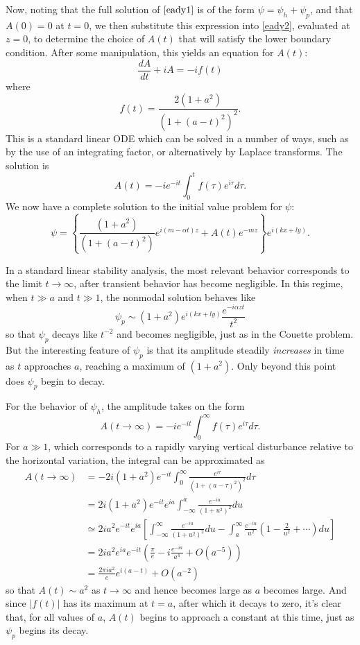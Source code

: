 \documentclass[letterpaper,11pt,onecolumn,twoside,titlepage]{article}
\begin{document}
Now, noting that the full solution of $\eqref{eady1}$ is of the form $\psi = \psi_h + \psi_p$, and that $A(0) = 0$ at $t=0$, we then substitute this expression into \eqref{eady2}, evaluated at $z=0$, to determine the choice of $A(t)$ that will satisfy the lower boundary condition. After some manipulation, this yields an equation for $A(t)$:
\[
\frac{dA}{dt}+iA=-if(t)
\]
where
\[
f(t)=\frac{2(1+a^2)}{(1+(a-t)^2)^2}.
\]
This is a standard linear ODE which can be solved in a number of ways, such as by the use of an integrating factor, or alternatively by Laplace transforms. The solution is
\[
A(t) = -ie^{-it}\int_0^t f(\tau) e^{i\tau} d\tau.
\]
We now have a complete solution to the initial value problem for $\psi$:
\begin{equation}
\psi = \left\{ \frac{(1+a^2)}{(1+(a-t)^2)} e^{i(m-\alpha t)z} + A(t)e^{-mz}\right\} e^{i(kx+ly)}.
\end{equation}

In a standard linear stability analysis, the most relevant behavior corresponds to the limit $t \rightarrow \infty$, after transient behavior has become negligible. In this regime, when $t \gg a$ and $t \gg 1$, the nonmodal solution behaves like
\[
\psi_p \sim (1+a^2) e^{i(kx+ly)} \frac{e^{-i \alpha z t}}{t^2}
\]
so that $\psi_p$ decays like $t^{-2}$ and becomes negligible, just as in the Couette problem. But the interesting feature of $\psi_p$ is that its amplitude steadily \emph{increases} in time as $t$ approaches $a$, reaching a maximum of $(1+a^2)$. Only beyond this point does $\psi_p$ begin to decay.

For the behavior of $\psi_h$, the amplitude takes on the form
\[
A(t \rightarrow \infty) = -ie^{-it} \int_0^\infty f(\tau) e^{i\tau} d\tau.
\]
For $a \gg 1$, which corresponds to a rapidly varying vertical disturbance relative to the horizontal variation, the integral can be approximated as
\[
\begin{split}
A(t\rightarrow\infty) & = -2i (1+a^2) e^{-it} \int_0^\infty \frac{e^{i\tau}}{(1+(a-\tau)^2)^2} d\tau \\
& = 2i (1+a^2) e^{-it} e^{ia} \int_{-\infty}^a \frac{e^{-iu}} {(1 + u^2)^2} du \\
& \simeq 2i a^2 e^{-it} e^{ia} \left[\int_{-\infty}^{\infty} \frac{e^{-iu}}{(1+u^2)^2} du - \int_{a}^{\infty} \frac{e^{-iu}}{u^2} \left(1 - \frac{2}{u^2} + \dotsb \right) du \right] \\
& = 2i a^2 e^{ia} e^{-it} \left(\frac{\pi}{e}-i\frac{e^{-ia}}{a^4} + O\left(a^{-5}\right) \right) \\
& = \frac{2\pi i a^2}{e} e^{i(a-t)} + O\left(a^{-2}\right)
\end{split}
\]
so that $A(t) \sim a^2$ as $t \rightarrow \infty$ and hence becomes large as $a$ becomes large. And since $|f(t)|$ has its maximum at $t=a$, after which it decays to zero, it's clear that, for all values of $a$, $A(t)$ begins to approach a constant at this time, just as $\psi_p$ begins its decay.
\end{document}
